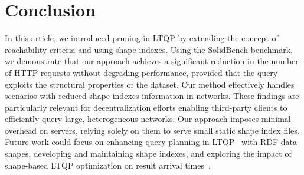 \section{Conclusion}

In this article, we introduced pruning in LTQP by extending the concept of reachability criteria and using shape indexes.
Using the SolidBench benchmark, we demonstrate that our approach achieves a significant reduction in the number of HTTP requests without degrading performance, provided that the query exploits the structural properties of the dataset.
Our method effectively handles scenarios with reduced shape indexes information in networks.
These findings are  particularly relevant for decentralization efforts enabling third-party clients to efficiently query large, heterogeneous networks.
Our approach imposes minimal overhead on servers, relying solely on them to serve small static shape index files.
Future work could focus on enhancing query planning in LTQP~\cite{taelman2024towards} with RDF data shapes, developing and maintaining shape indexes, and exploring the impact of shape-based LTQP optimization on result arrival times~\cite{Acosta2017}.

